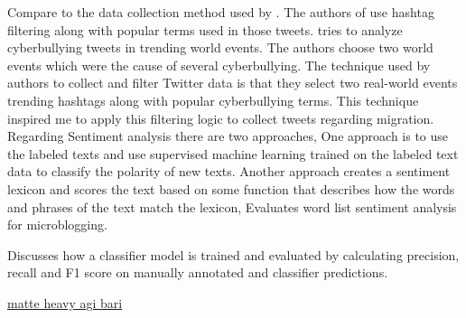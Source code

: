 Compare to the data collection method used by \cite{Hübl}. The authors of \cite{Cortis} use hashtag filtering
along with popular terms used in those tweets. \cite{Cortis} tries to analyze cyberbullying tweets in trending
world events. The authors choose two world events which were the cause of several cyberbullying.
The technique used by authors to collect and filter Twitter data is that they select two real-world
events trending hashtags along with popular cyberbullying terms. This technique inspired me to
apply this filtering logic to collect tweets regarding migration.
Regarding Sentiment analysis there are two approaches, One approach is to use the labeled
texts and use supervised machine learning trained on the labeled text data to classify the polarity
of new texts. Another approach creates a sentiment lexicon and scores the text based on some
function that describes how the words and phrases of the text match the lexicon, \cite{DBLP} Evaluates
word list sentiment analysis for microblogging.

 \cite{Jamie} Discusses how a classifier model is trained
and evaluated by calculating precision, recall and F1 score on manually annotated and classifier
predictions.


 \underline{matte heavy agi bari}
